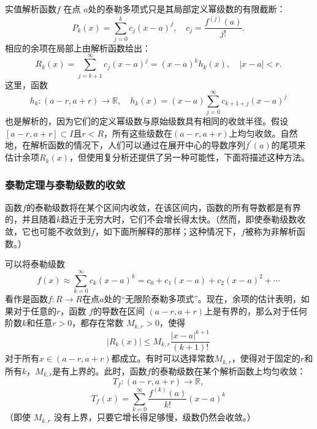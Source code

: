 实值解析函数\( f \) 在点 \( a \)处的泰勒多项式只是其局部定义幂级数的有限截断：
\[
P_k(x) = \sum_{j=0}^{k} c_j (x - a)^j, \quad c_j = \frac{f^{(j)}(a)}{j!}.~
\]
相应的余项在局部上由解析函数给出：
\[
R_k(x) = \sum_{j=k+1}^{\infty} c_j (x - a)^j = (x - a)^k h_k(x), \quad |x - a| < r.~
\]
这里，函数
\[
h_k : (a - r, a + r) \to \mathbb{R}, \quad h_k(x) = (x - a) \sum_{j=0}^{\infty} c_{k+1+j} (x - a)^j~
\]
也是解析的，因为它们的定义幂级数与原始级数具有相同的收敛半径。假设\( [a - r, a + r] \subset I \)且\( r < R \)，所有这些级数在\( (a - r, a + r) \)上均匀收敛。自然地，在解析函数的情况下，人们可以通过在展开中心的导数序列\( f^{'}(a) \)的尾项来估计余项\( R_k(x) \)，但使用复分析还提供了另一种可能性，下面将描述这种方法。
\subsubsection{泰勒定理与泰勒级数的收敛}  
函数\( f \)的泰勒级数将在某个区间内收敛，在该区间内，函数的所有导数都是有界的，并且随着\( k \)趋近于无穷大时，它们不会增长得太快。（然而，即使泰勒级数收敛，它也可能不收敛到\( f \)，如下面所解释的那样；这种情况下，\( f \)被称为非解析函数。）

可以将泰勒级数
\[
f(x) \approx \sum_{k=0}^{\infty} c_k (x - a)^k = c_0 + c_1 (x - a) + c_2 (x - a)^2 + \cdots~
\]
看作是函数\( f : R \to R \)在点\( a \)处的“无限阶泰勒多项式”。现在，余项的估计表明，如果对于任意的\( r \)，函数 \( f \)的导数在区间 \( (a - r, a + r) \)上是有界的，那么对于任何阶数\( k \)和任意\( r > 0 \)，都存在常数 \( M_{k,r} > 0 \)，使得
\[
|R_k(x)| \leq M_{k,r} \frac{|x - a|^{k+1}}{(k+1)!}~
\]
对于所有\( x \in (a - r, a + r) \)都成立。有时可以选择常数\( M_{k,r} \)，使得对于固定的\( r \)和所有\( k \)，\( M_{k,r} \)是有上界的。此时，函数\( f \)的泰勒级数在某个解析函数上均匀收敛：
\[
T_f : (a - r, a + r) \to \mathbb{R},~
\]
\[
T_f(x) = \sum_{k=0}^{\infty} \frac{f^{(k)}(a)}{k!} (x - a)^k~
\]
（即使 \( M_{k,r} \) 没有上界，只要它增长得足够慢，级数仍然会收敛。）